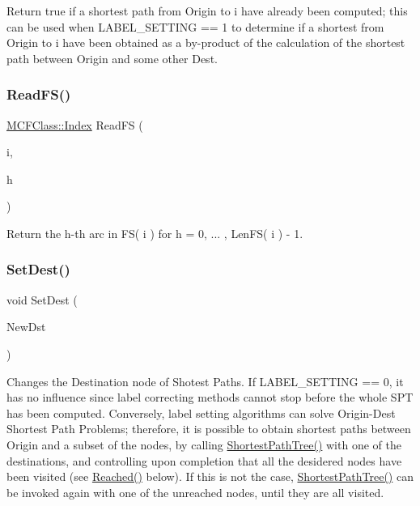 Return true if a shortest path from Origin to i have already been computed; this can be used when L\+A\+B\+E\+L\+\_\+\+S\+E\+T\+T\+I\+NG == 1 to determine if a shortest from Origin to i have been obtained as a by-\/product of the calculation of the shortest path between Origin and some other Dest. \mbox{\label{class_s_p_tree_afd79f2ffc8ffb4e444fa60a6bb4ebbe1}} 
\subsubsection{\texorpdfstring{Read\+F\+S()}{ReadFS()}}
{\footnotesize\ttfamily \mbox{\hyperlink{class_m_c_f_class_ad53d6229d7ec28555a9c9c2fd9abf773}{M\+C\+F\+Class\+::\+Index}} Read\+FS (\begin{DoxyParamCaption}\item[{\mbox{\hyperlink{class_m_c_f_class_a76aaabb20535c51a2752b93f6c38fe54}{c\+Index}}}]{i,  }\item[{\mbox{\hyperlink{class_m_c_f_class_a76aaabb20535c51a2752b93f6c38fe54}{c\+Index}}}]{h }\end{DoxyParamCaption})\hspace{0.3cm}{\ttfamily [inline]}}

Return the h-\/th arc in F\+S( i ) for h = 0, ... , Len\+F\+S( i ) -\/ 1. \mbox{\label{class_s_p_tree_a1fad8461dbf04f0981f698a4d1b9fbd9}} 
\subsubsection{\texorpdfstring{Set\+Dest()}{SetDest()}}
{\footnotesize\ttfamily void Set\+Dest (\begin{DoxyParamCaption}\item[{\mbox{\hyperlink{class_m_c_f_class_a76aaabb20535c51a2752b93f6c38fe54}{c\+Index}}}]{New\+Dst }\end{DoxyParamCaption})\hspace{0.3cm}{\ttfamily [inline]}}

Changes the Destination node of Shotest Paths. If L\+A\+B\+E\+L\+\_\+\+S\+E\+T\+T\+I\+NG == 0, it has no influence since label correcting methods cannot stop before the whole S\+PT has been computed. Conversely, label setting algorithms can solve Origin-\/\+Dest Shortest Path Problems; therefore, it is possible to obtain shortest paths between Origin and a subset of the nodes, by calling \mbox{\hyperlink{class_s_p_tree_a76e377a946e5a08dba5172117eaf68a8}{Shortest\+Path\+Tree()}} with one of the destinations, and controlling upon completion that all the desidered nodes have been visited (see \mbox{\hyperlink{class_s_p_tree_a451041eba0632676692f2de798bea4d7}{Reached()}} below). If this is not the case, \mbox{\hyperlink{class_s_p_tree_a76e377a946e5a08dba5172117eaf68a8}{Shortest\+Path\+Tree()}} can be invoked again with one of the unreached nodes, until they are all visited.

